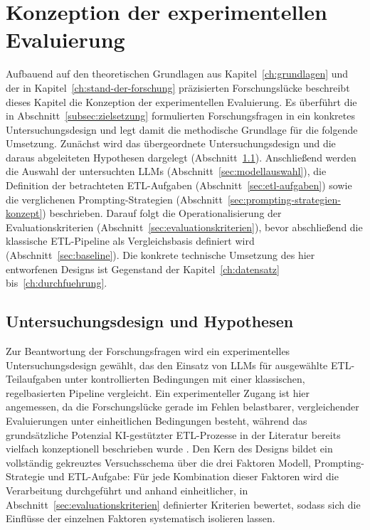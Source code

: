 
\chapter{Konzeption der experimentellen Evaluierung}
\label{ch:konzeption}

Aufbauend auf den theoretischen Grundlagen aus Kapitel~\ref{ch:grundlagen} und der in Kapitel~\ref{ch:stand-der-forschung} präzisierten Forschungslücke beschreibt dieses Kapitel die Konzeption der experimentellen Evaluierung. Es überführt die in Abschnitt~\ref{subsec:zielsetzung} formulierten Forschungsfragen in ein konkretes Untersuchungsdesign und legt damit die methodische Grundlage für die folgende Umsetzung. Zunächst wird das übergeordnete Untersuchungsdesign und die daraus abgeleiteten Hypothesen dargelegt (Abschnitt~\ref{sec:forschungsdesign}). Anschließend werden die Auswahl der untersuchten \acp{LLM} (Abschnitt~\ref{sec:modellauswahl}), die Definition der betrachteten \ac{ETL}-Aufgaben (Abschnitt~\ref{sec:etl-aufgaben}) sowie die verglichenen Prompting-Strategien (Abschnitt~\ref{sec:prompting-strategien-konzept}) beschrieben. Darauf folgt die Operationalisierung der Evaluationskriterien (Abschnitt~\ref{sec:evaluationskriterien}), bevor abschließend die klassische \ac{ETL}-Pipeline als Vergleichsbasis definiert wird (Abschnitt~\ref{sec:baseline}). Die konkrete technische Umsetzung des hier entworfenen Designs ist Gegenstand der Kapitel~\ref{ch:datensatz} bis~\ref{ch:durchfuehrung}.

\section{Untersuchungsdesign und Hypothesen}
\label{sec:forschungsdesign}

Zur Beantwortung der Forschungsfragen wird ein experimentelles Untersuchungsdesign gewählt, das den Einsatz von \acp{LLM} für ausgewählte \ac{ETL}-Teilaufgaben unter kontrollierten Bedingungen mit einer klassischen, regelbasierten Pipeline vergleicht. Ein experimenteller Zugang ist hier angemessen, da die Forschungslücke gerade im Fehlen belastbarer, vergleichender Evaluierungen unter einheitlichen Bedingungen besteht, während das grundsätzliche Potenzial \ac{KI}-gestützter \ac{ETL}-Prozesse in der Literatur bereits vielfach konzeptionell beschrieben wurde \autocite{walhaDataIntegrationTraditional2024,aAIEnhancedETLProcesses2025}. Den Kern des Designs bildet ein vollständig gekreuztes Versuchsschema über die drei Faktoren Modell, Prompting-Strategie und \ac{ETL}-Aufgabe: Für jede Kombination dieser Faktoren wird die Verarbeitung durchgeführt und anhand einheitlicher, in Abschnitt~\ref{sec:evaluationskriterien} definierter Kriterien bewertet, sodass sich die Einflüsse der einzelnen Faktoren systematisch isolieren lassen.

